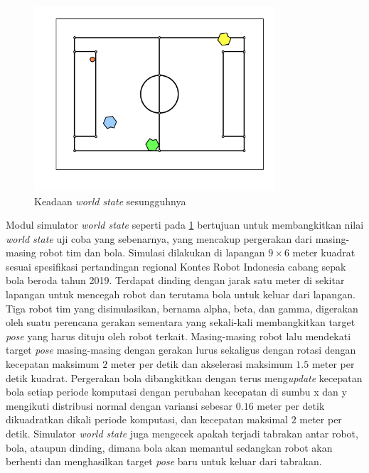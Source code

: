 \begin{figure}[h]
    \centering
    \medskip
    \includegraphics[width=0.8\textwidth]{resources/true-world-state.png}
    \caption{Keadaan \textit{world state} sesungguhnya}
    \label{fig:true-world-state}
    \bigskip
\end{figure}

Modul simulator \textit{world state} seperti pada \ref{fig:true-world-state} bertujuan untuk membangkitkan nilai \textit{world state} uji coba yang sebenarnya, yang mencakup pergerakan dari masing-masing robot tim dan bola. Simulasi dilakukan di lapangan $9 \times 6$ meter kuadrat sesuai spesifikasi pertandingan regional Kontes Robot Indonesia cabang sepak bola beroda tahun 2019. Terdapat dinding dengan jarak satu meter di sekitar lapangan untuk mencegah robot dan terutama bola untuk keluar dari lapangan. Tiga robot tim yang disimulasikan, bernama alpha, beta, dan gamma, digerakan oleh suatu perencana gerakan sementara yang sekali-kali membangkitkan target \textit{pose} yang harus dituju oleh robot terkait. Masing-masing robot lalu mendekati target \textit{pose} masing-masing dengan gerakan lurus sekaligus dengan rotasi dengan kecepatan maksimum $2$ meter per detik dan akselerasi maksimum $1.5$ meter per detik kuadrat. Pergerakan bola dibangkitkan dengan terus meng\textit{update} kecepatan bola setiap periode komputasi dengan perubahan kecepatan di sumbu x dan y mengikuti distribusi normal dengan variansi sebesar $0.16$ meter per detik dikuadratkan dikali periode komputasi, dan kecepatan maksimal $2$ meter per detik. Simulator \textit{world state} juga mengecek apakah terjadi tabrakan antar robot, bola, ataupun dinding, dimana bola akan memantul sedangkan robot akan berhenti dan menghasilkan target \textit{pose} baru untuk keluar dari tabrakan.

